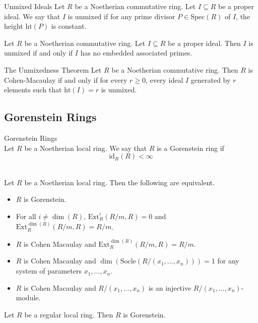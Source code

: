 \documentclass[a4paper]{article}
\begin{document}
\begin{defn}{Unmixed Ideals}{} Let $R$ be a Noetherian commutative ring. Let $I\subseteq R$ be a proper ideal. We say that $I$ is unmixed if for any prime divisor $P\in\text{Spec}(R)$ of $I$, the height $\text{ht}(P)$ is constant. 
\end{defn}

\begin{lmm}{}{} Let $R$ be a Noetherian commutative ring. Let $I\subseteq R$ be a proper ideal. Then $I$ is unmixed if and only if $I$ has no embedded associated primes. 
\end{lmm}

\begin{thm}{The Unmixedness Theorem}{} Let $R$ be a Noetherian commutative ring. Then $R$ is Cohen-Macaulay if and only if for every $r\geq 0$, every ideal $I$ generated by $r$ elements such that $\text{ht}(I)=r$ is unmixed. 
\end{thm}

\subsection{Gorenstein Rings}
\begin{defn}{Gorenstein Rings}{}\\
Let $R$ be a Noetherian local ring. We say that $R$ is a Gorenstein ring if $$\text{id}_R(R)<\infty$$
\end{defn}

\begin{prp}{}{}\\
Let $R$ be a Noetherian local ring. Then the following are equivalent. 
\begin{itemize}
\item $R$ is Gorenstein. 
\item For all $i\neq\dim(R)$, $\text{Ext}_R^i(R/m,R)=0$ and $\text{Ext}_R^{\dim(R)}(R/m,R)=R/m$. 
\item $R$ is Cohen Macaulay and $\text{Ext}_R^{\dim(R)}(R/m,R)=R/m$. 
\item $R$ is Cohen Macaulay and $\dim(\text{Socle}(R/(x_1,\dots,x_n)))=1$ for any system of parameters $x_1,\dots,x_n$. 
\item $R$ is Cohen Macaulay and $R/(x_1,\dots,x_n)$ is an injective $R/(x_1,\dots,x_n)$-module. 
\end{itemize}
\end{prp}

\begin{crl}{}{} Let $R$ be a regular local ring. Then $R$ is Gorenstein. 
\end{crl}
\end{document}
